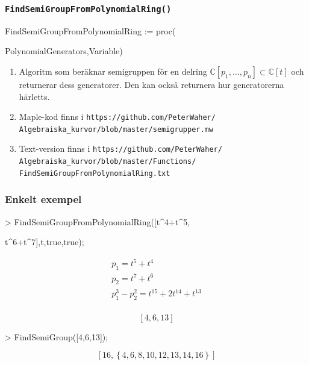 \documentclass{beamer}
\begin{document}
\begin{frame}
	\frametitle{\texttt{FindSemiGroupFromPolynomialRing()}}
	
	\begin{semiverbatim}
		FindSemiGroupFromPolynomialRing := proc( 

		\qquad PolynomialGenerators,Variable)
	\end{semiverbatim}
	
	\begin{enumerate}
		\item<1-> Algoritm som beräknar semigruppen för en delring $\mathbb{C}[p_1,\ldots,p_n] \subset \mathbb{C}[t]$ och returnerar dess generatorer. Den kan också returnera hur generatorerna härletts.
		
		\item<2-> Maple-kod finns i \texttt{https://github.com/PeterWaher/\\
			\qquad Algebraiska\_kurvor/blob/master/semigrupper.mw}
		
		\item<3-> Text-version finns i
		\texttt{https://github.com/PeterWaher/\\
			\qquad Algebraiska\_kurvor/blob/master/Functions/\\
			\qquad FindSemiGroupFromPolynomialRing.txt} 
	\end{enumerate}
\end{frame}

\begin{frame}
	\frametitle{Enkelt exempel}
	
	\begin{example}
		\begin{semiverbatim}
			> FindSemiGroupFromPolynomialRing([t\^{}4+t\^{}5,

\qquad t\^{}6+t\^{}7],t,true,true);
		\end{semiverbatim}
\[\begin{array}{c}
p_1 = t^5 + t^4\\[3pt]
p_2 = t^7 + t^6\\[3pt]
p_1^3 - p_2^2 = t^{15} + 2 t^{14} + t^{13}\\
\end{array}\]

\[\left[4, 6, 13\right]\]

\begin{semiverbatim}
> FindSemiGroup([4,6,13]);
\end{semiverbatim}
\[\left[16, \left\{4, 6, 8, 10, 12, 13, 14, 16\right\}\right]\]
	\end{example}
\end{frame}
\end{document}

